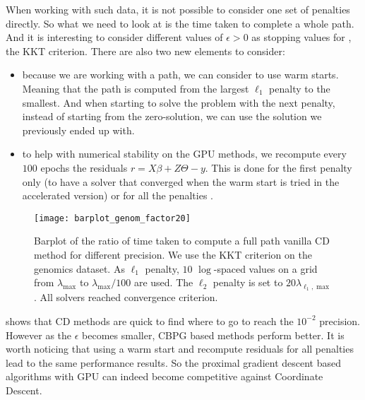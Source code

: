 \documentclass[../main.tex]{subfiles}
\begin{document}
When working with such data, it is not possible to consider one set of penalties
directly.
So what we need to look at is the time taken to complete a whole path.
And it is interesting to consider different values of $\epsilon>0$ as stopping
values for , the KKT criterion.
There are also two new elements to consider:
\begin{itemize}
    \item because we are working with a path, we can consider to use warm starts.
    Meaning that the path is computed from the largest $\ell_1$ penalty to the smallest.
    And when starting to solve the problem with the next penalty, instead of starting
    from the zero-solution, we can use the solution we previously ended up with.
    \item to help with numerical stability on the GPU methods, we recompute every $100$ epochs the residuals $r=X\beta + Z\Theta - y$.
    This is done for the first penalty only (to have a solver that converged when
    the warm start is tried in the accelerated version) or for all the penalties \ow.
\end{itemize}
\begin{figure}[ht]
    \centering
    \texttt{[image: barplot\_genom\_factor20]}
    \caption{Barplot of the ratio of time taken to compute a full path \wrt
    vanilla CD method for different precision.
    We use the KKT criterion on the genomics dataset.
    As $\ell_1$ penalty, $10$ $\log$-spaced values on a grid
     from $\lambda_{\max}$ to $\lambda_{\max}/100$ are used.
     The $\ell_2$ penalty is set to $20\lambda_{\ell_1, \max}$.
     All solvers reached convergence criterion.}
    \label{fig:barplots_genom}
\end{figure}

 shows that CD methods are quick to find where to go
to reach the $10^{-2}$ precision.
However as the $\epsilon$ becomes smaller, CBPG based methods perform better.
It is worth noticing that using a warm start and recompute residuals for all
penalties lead to the same performance results.
So the proximal gradient descent based algorithms with GPU can indeed become
competitive against Coordinate Descent.
\end{document}
